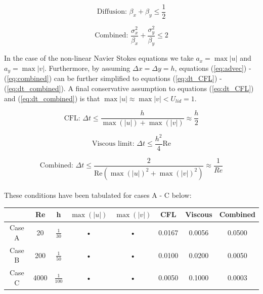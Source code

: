 \documentclass[10pt,a4paper]{article}
\begin{document}
\begin{equation}
\label{eq:dif}
\text{Diffusion: } \beta_x + \beta_y \leq \frac{1}{2}
\end{equation}

\begin{equation}
\label{eq:combined}
\text{Combined: } \frac{\sigma_x^2}{\beta_x} + \frac{\sigma_y^2}{\beta_y} \leq 2
\end{equation} 

In the case of the non-linear Navier Stokes equations we take $a_x = \max{|u|}$ and $a_y = \max{|v|}$. Furthermore, by assuming $\Delta x = \Delta y = h$, equations (\ref{eq:advec}) - (\ref{eq:combined}) can be further simplified to equations (\ref{eq:dt_CFL}) - (\ref{eq:dt_combined}). A final conservative assumption to equations  (\ref{eq:dt_CFL}) and (\ref{eq:dt_combined}) is that $ \max{|u|} \approx\max{|v|} < U_{lid} = 1$.

\begin{equation}
\label{eq:dt_CFL}
\text{CFL: } \Delta t \leq \frac{h}{\max(|u|) + \max(|v|)}  \approx \frac{h}{2}
\end{equation}

\begin{equation}
\label{eq:dt_diffusion}
\text{Viscous limit: } \Delta t \leq \frac{h^2}{4} \text{Re}
\end{equation}

\begin{equation}
\label{eq:dt_combined}
\text{Combined: } \Delta t \leq \frac{2}{\text{Re} \left(\max(|u|)^2 + \max(|v|)^2\right)}  \approx \frac{1}{Re}
\end{equation}\\




These conditions have been tabulated for cases A - C below:

\begin{center}


\begin{tabular}{c|cccc|ccc}

 & Re & h & $\max(|u|)$ & $\max(|v|)$ & CFL & Viscous & Combined \\ 
\hline 
Case A  & 20 & $\frac{1}{30}$ & •& • & 0.0167 & 0.0056 & 0.0500 \\ 

Case B  & 200  & $\frac{1}{50}$ & •& • & 0.0100 & 0.0200& 0.0050  \\ 

Case C & 4000 & $\frac{1}{100}$ & •& • & 0.0050 & 0.1000 & 0.0003  \\ 

\end{tabular} 
\end{center}
\end{document}

